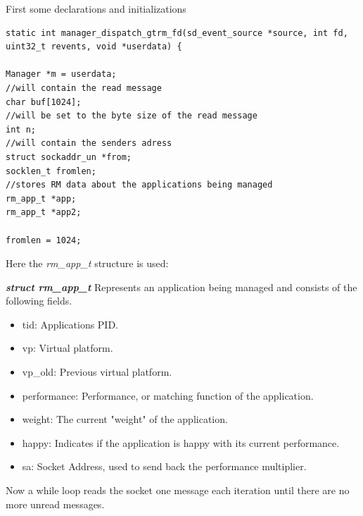 \documentclass[nobiblatex]{LTHthesis}
\begin{document}
First some declarations and initializations

\begin{verbatim}
static int manager_dispatch_gtrm_fd(sd_event_source *source, int fd,
uint32_t revents, void *userdata) {

Manager *m = userdata;    		    
//will contain the read message
char buf[1024];
//will be set to the byte size of the read message
int n;
//will contain the senders adress
struct sockaddr_un *from;
socklen_t fromlen;
//stores RM data about the applications being managed
rm_app_t *app;
rm_app_t *app2;	

fromlen = 1024;
\end{verbatim}

Here the \emph{rm\_app\_t} structure is used:

\begin{framed}
		\begin{flushleft}
			\textbf{\emph{struct rm\_app\_t}}
			Represents an application being managed and consists of the following fields.
			\begin{itemize}
			\item tid: Applications PID.
			\item vp: Virtual platform.
			\item vp\_old: Previous virtual platform.
			\item performance: Performance, or matching function of the application.
			\item weight: The current "weight" of the application.
			\item happy: Indicates if the application is happy with its current performance.
			\item sa: Socket Address, used to send back the performance multiplier.
			\end{itemize}
		\end{flushleft}	
\end{framed}






Now a while loop reads the socket one message each iteration until there are no more unread messages. 
\end{document}
